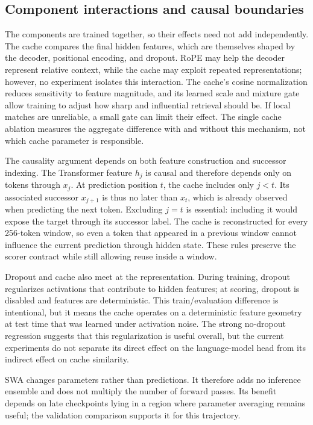 \documentclass[11pt]{article}
\begin{document}
\subsection{Component interactions and causal boundaries}
The components are trained together, so their effects need not add independently. The cache compares the final hidden features, which are themselves shaped by the decoder, positional encoding, and dropout. RoPE may help the decoder represent relative context, while the cache may exploit repeated representations; however, no experiment isolates this interaction. The cache's cosine normalization reduces sensitivity to feature magnitude, and its learned scale and mixture gate allow training to adjust how sharp and influential retrieval should be. If local matches are unreliable, a small gate can limit their effect. The single cache ablation measures the aggregate difference with and without this mechanism, not which cache parameter is responsible.

The causality argument depends on both feature construction and successor indexing. The Transformer feature $h_j$ is causal and therefore depends only on tokens through $x_j$. At prediction position $t$, the cache includes only $j<t$. Its associated successor $x_{j+1}$ is thus no later than $x_t$, which is already observed when predicting the next token. Excluding $j=t$ is essential: including it would expose the target through its successor label. The cache is reconstructed for every 256-token window, so even a token that appeared in a previous window cannot influence the current prediction through hidden state. These rules preserve the scorer contract while still allowing reuse inside a window.

Dropout and cache also meet at the representation. During training, dropout regularizes activations that contribute to hidden features; at scoring, dropout is disabled and features are deterministic. This train/evaluation difference is intentional, but it means the cache operates on a deterministic feature geometry at test time that was learned under activation noise. The strong no-dropout regression suggests that this regularization is useful overall, but the current experiments do not separate its direct effect on the language-model head from its indirect effect on cache similarity.

SWA changes parameters rather than predictions. It therefore adds no inference ensemble and does not multiply the number of forward passes. Its benefit depends on late checkpoints lying in a region where parameter averaging remains useful; the validation comparison supports it for this trajectory.
\end{document}
